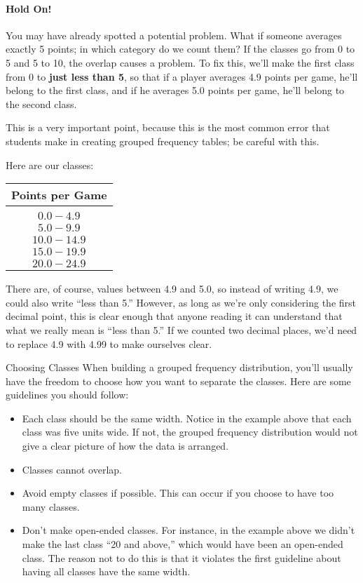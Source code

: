 \paragraph{Hold On!} You may have already spotted a potential problem.  What if someone averages exactly 5 points; in which category do we count them?  If the classes go from 0 to 5 and 5 to 10, the overlap causes a problem.  To fix this, we'll make the first class from 0 to \textbf{just less than 5}, so that if a player averages 4.9 points per game, he'll belong to the first class, and if he averages 5.0 points per game, he'll belong to the second class.

This is a very important point, because this is the most common error that students make in creating grouped frequency tables; be careful with this.\\
\vfill

Here are our classes:
\begin{center}
\begin{tabular}{c}
\textbf{Points per Game}\\
\hline
\\
$0.0 - 4.9$\\
$5.0 - 9.9$\\
$10.0 - 14.9$\\
$15.0 - 19.9$\\
$20.0 - 24.9$
\end{tabular}
\end{center}

There are, of course, values between 4.9 and 5.0, so instead of writing 4.9, we could also write ``less than 5.''  However, as long as we're only considering the first decimal point, this is clear enough that anyone reading it can understand that what we really mean is ``less than 5.''  If we counted two decimal places, we'd need to replace 4.9 with 4.99 to make ourselves clear.
\vfill
\text{}
\pagebreak

\begin{proc}{Choosing Classes}
When building a grouped frequency distribution, you'll usually have the freedom to choose how you want to separate the classes.  Here are some guidelines you should follow:
\begin{itemize}
\item Each class should be the same width.  Notice in the example above that each class was five units wide.  If not, the grouped frequency distribution would not give a clear picture of how the data is arranged.
\item Classes cannot overlap.
\item Avoid empty classes if possible.  This can occur if you choose to have too many classes.
\item Don't make open-ended classes.  For instance, in the example above we didn't make the last class ``20 and above,'' which would have been an open-ended class.  The reason not to do this is that it violates the first guideline about having all classes have the same width.
\end{itemize}
\end{proc}

